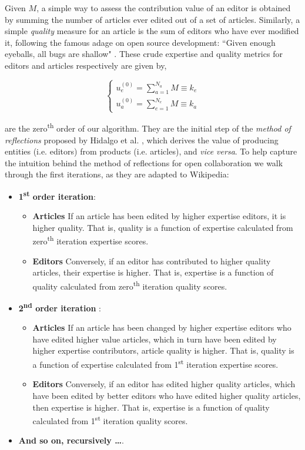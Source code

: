 Given $M$, a simple way to assess the contribution value of an editor is obtained by summing the number of articles ever edited out of a set of articles. Similarly, a simple {\it quality} measure for an article is the sum of editors who have ever modified it, following the famous adage on open source development: ``Given enough eyeballs, all bugs are shallow" \cite{raymond1999}. These crude expertise and quality metrics for editors and articles respectively are given by,

\begin{equation}
\begin{cases}
 u_{e}^{(0)} = \sum_{a=1}^{N_{a}} M \equiv k_e\\[7pt]
 u_{a}^{(0)} = \sum_{e=1}^{N_{e}} M \equiv k_a
\end{cases}
\label{HHinit}
\end{equation}

are the zero\textsuperscript{th} order of our algorithm. They are  the initial step of the {\it method of reflections} proposed by Hidalgo et al. \cite{hidalgo2007,hidalgo2009}, which derives the value of producing entities (i.e. editors) from products (i.e. articles), and {\it vice versa}. To help capture the intuition behind the method of reflections for open collaboration we walk through the first iterations, as they are adapted to Wikipedia:

\begin{itemize}
  \item {\bf 1\textsuperscript{st} order iteration}:  
  \begin{itemize}
  \item {\bf Articles} If an article has been edited by higher expertise editors, it is higher quality. That is, quality is a function of expertise calculated from zero\textsuperscript{th} iteration expertise scores.
  \item {\bf Editors} Conversely, if an editor has contributed to higher quality articles, their expertise is higher. That is, expertise is a function of quality calculated from zero\textsuperscript{th} iteration quality scores.
  \end{itemize}
  \item {\bf 2\textsuperscript{nd} order iteration} : 
    \begin{itemize}
  \item {\bf Articles} If an article has been changed by higher expertise editors who have edited higher value articles, which in turn have been edited by higher expertise contributors, article quality is higher. That is, quality is a function of expertise calculated from 1\textsuperscript{st} iteration expertise scores.
  \item {\bf Editors} Conversely, if an editor has edited higher quality articles, which have been edited by better editors who have edited higher quality articles, then expertise is higher. That is, expertise is a function of quality calculated from 1\textsuperscript{st} iteration quality scores.
  \end{itemize}
 \item {\bf And so on, recursively \ldots}.\\
\end{itemize}

